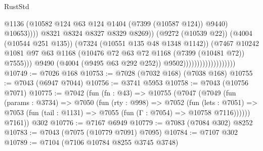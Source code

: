 \begin{lexlean}{RustStd}
\begin{coremodule}
                                                        @1136
                                                        (@10582
                                                          @124
                                                          @63
                                                          @124
                                                          @1404
                                                          (@7399 (@10587 @124))
                                                          @9440)
                                                        @10653))))
                                                @8321
                                                @8324
                                                @8327
                                                @8329
                                                @8269))
                                            (@9272 (@10539 @22))
                                            (@4004 (@10544 @251 @135))
                                            (@7324 (@10551 @135 @48 @1348 @1142))
                                            (@7467
                                              @10242
                                              @1081
                                              @97
                                              @63
                                              @1168
                                              (@10476
                                                @72
                                                @63
                                                @72
                                                @1168
                                                (@7399 (@10481 @72))
                                                @7555)))
                                          @9490
                                          (@4004 (@9495 @63 @292 @252))
                                          @9502)))))))))))))))))))
@10749 := @7026 @168
@10753 := @7028 (@7032 @168) (@7038 @168)
@10755 := @7043 (@6947 @7044)
@10756 := @3741 @5953
@10758 := @7043 (@10756 @7071)
@10775 := @7042
    (fun (fn : @43) =>
    @10755
      (@7047
        (@7049
          (fun (params : @3734) =>
          @7050
            (fun (rty : @998) =>
            @7052
              (fun (lets : @7051) =>
              @7053 (fun (tail : @1131) => @7055 (fun (Γ : @7054) => @10758 @7116))))))
        @7161))
    @302
@10776 := @7167 @6949
@10779 := @7083 (@7084 @302) @8252
@10783 := @7043 (@7075 (@10779 @7091) @7095)
@10784 := @7107 @302
@10789 := @7104 (@7106 @10784 @8255 @3745 @3748)

\end{coremodule}
\end{lexlean}

